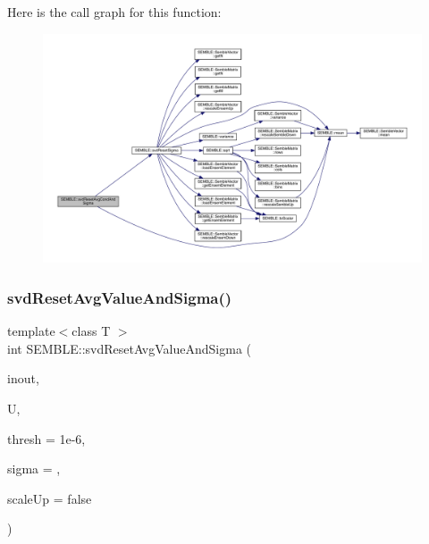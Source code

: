 Here is the call graph for this function\+:
\nopagebreak
\begin{figure}[H]
\begin{center}
\leavevmode
\includegraphics[width=350pt]{d7/dfd/namespaceSEMBLE_a14b6eda564f38c74c1fff912f2747138_cgraph}
\end{center}
\end{figure}
\mbox{\label{namespaceSEMBLE_a236bc079d6aa849513a7ea270a9116b4}} 
\subsubsection{\texorpdfstring{svdResetAvgValueAndSigma()}{svdResetAvgValueAndSigma()}}
{\footnotesize\ttfamily template$<$class T $>$ \\
int S\+E\+M\+B\+L\+E\+::svd\+Reset\+Avg\+Value\+And\+Sigma (\begin{DoxyParamCaption}\item[{\mbox{\hyperlink{structSEMBLE_1_1SembleVector}{Semble\+Vector}}$<$ double $>$ \&}]{inout,  }\item[{\mbox{\hyperlink{structSEMBLE_1_1SembleMatrix}{Semble\+Matrix}}$<$ T $>$ \&}]{U,  }\item[{const double}]{thresh = {\ttfamily 1e-\/6},  }\item[{const double}]{sigma = {},  }\item[{const bool}]{scale\+Up = {\ttfamily false} }\end{DoxyParamCaption})}

